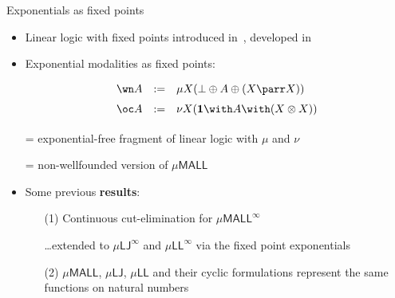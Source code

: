 \documentclass[10pt]{beamer}
\theoremstyle{definition}
\theoremstyle{plain}
\newcommand{\dfn}{:=}
\newcommand{\LJ}{\mathsf{LJ}}
\newcommand{\muLJ}{\mu\LJ}
\newcommand{\MALL}{\mathsf{MALL}}
\newcommand{\muMALL}{\mu\MALL}
\begin{document}
\begin{frame}{Exponentials as fixed points}
	\begin{itemize}
		\item Linear logic with fixed points introduced in~\cite{BaeldeM07},  developed in~\cite{BaeldeDS16}
		\medskip
		\item Exponential modalities as fixed points:
		\[
		\def\arraystretch{1.5}
		\begin{array}{rcl}
			\wn A &\dfn& \mu X(\bot \oplus A \oplus (X \parr X))\\
			\oc A	&\dfn& \nu X(\mathbf{1} \with A \with (X \otimes X) )
		\end{array}
		\]
		\smallskip
		\item[] \structure{$\muMALL$} = exponential-free fragment of linear logic with $\mu$ and $\nu$
		\medskip
		\item[] \structure{$\muMALL^\infty$} =  non-wellfounded version of $\muMALL$\bigskip\pause 
		\item Some previous  \textbf{results}:
		\smallskip
		\begin{itemize}
			\item[(1)] Continuous cut-elimination for  $\muMALL^\infty$~\cite{BaeldeDS16}\medskip
			\item[] \ldots extended to $\muLJ^\infty$ and $\mu\mathsf{LL}^\infty$ via the  fixed point exponentials~\cite{Saurin}\medskip
			\item[(2)]  $\muMALL$, $\muLJ$, $\mu\mathsf{LL}$ and their cyclic formulations represent the same functions on natural numbers~\cite{Curzi023}
		\end{itemize}
	\end{itemize}
\end{frame}
\end{document}
